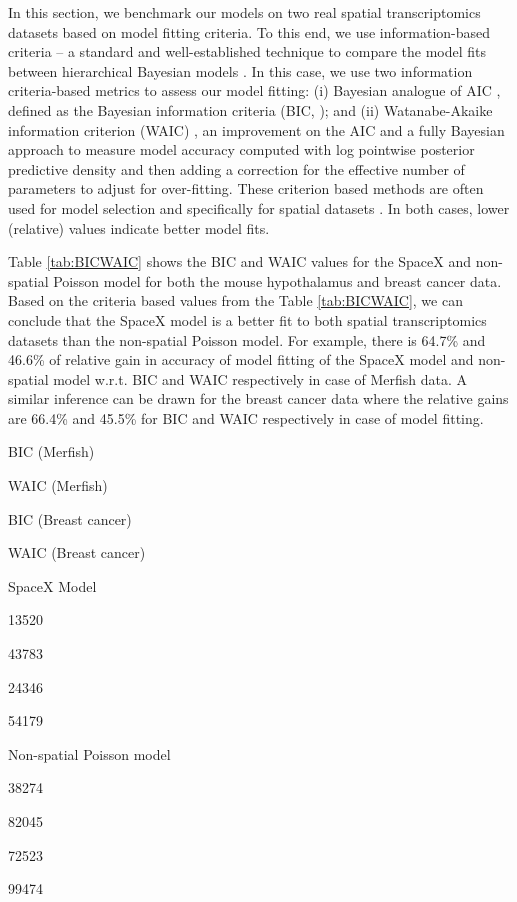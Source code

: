 \documentclass[
]{book}
\begin{document}
In this section, we benchmark our models on two real spatial transcriptomics datasets based on model fitting criteria. To this end, we use information-based criteria -- a standard and well-established technique to compare the model fits between hierarchical Bayesian models \citep{gelman2014understanding}. In this case, we use two information criteria-based metrics to assess our model fitting: (i) Bayesian analogue of AIC \citep{akaike1998information}, defined as the Bayesian information criteria (BIC, \citet{watanabe2013widely}); and (ii) Watanabe-Akaike information criterion (WAIC) \citep{watanabe2010asymptotic}, an improvement on the AIC and a fully Bayesian approach to measure model accuracy computed with log pointwise posterior predictive density and then adding a correction for the effective number of parameters to adjust for over-fitting. These criterion based methods are often used for model selection and specifically for spatial datasets \citep{banerjee2003frailty, banerjee2000geostatistical, lee2009performance}. In both cases, lower (relative) values indicate better model fits.

Table \ref{tab:BICWAIC} shows the BIC and WAIC values for the SpaceX and non-spatial Poisson model for both the mouse hypothalamus and breast cancer data. Based on the criteria based values from the Table \ref{tab:BICWAIC}, we can conclude that the SpaceX model is a better fit to both spatial transcriptomics datasets than the non-spatial Poisson model. For example, there is 64.7\% and 46.6\% of relative gain in accuracy of model fitting of the SpaceX model and non-spatial model w.r.t. BIC and WAIC respectively in case of Merfish data. A similar inference can be drawn for the breast cancer data where the relative gains are 66.4\% and 45.5\% for BIC and WAIC respectively in case of model fitting.

BIC (Merfish)

WAIC (Merfish)

BIC (Breast cancer)

WAIC (Breast cancer)

SpaceX Model

13520

43783

24346

54179

Non-spatial Poisson model

38274

82045

72523

99474
\end{document}
